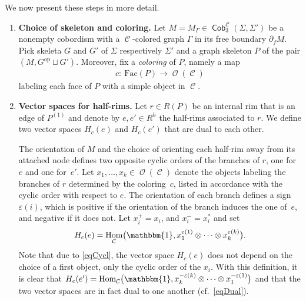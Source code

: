 \documentclass[pdftex]{sigma}
\DeclareMathOperator{\Hom}{Hom}
\DeclareMathOperator{\Cob}{\mathsf{Cob}}
\DeclareMathOperator{\calc}{\mathcal{C}}
\DeclareMathOperator{\calo}{\mathcal{O}}
\numberwithin{equation}{section}
\theoremstyle{definition}
\begin{document}
We now present these steps in more detail.
\begin{enumerate}\itemsep=0pt
 \item \textbf{Choice of skeleton and coloring.}
 Let $M = M_{\Gamma} \in \Cob_3^{\calc}(\Sigma, \Sigma')$ be a nonempty cobordism with a $\calc$-colored graph $\Gamma$ in its free boundary $\partial_fM$. Pick skeleta $G$ and $G'$ of $\Sigma$ respectively $\Sigma'$ and a graph skeleton $P$ of the pair $(M, G^{\mathrm{op}} \sqcup G')$. Moreover, fix a \textit{coloring} of $P$, namely a map
 \begin{align*}
 c\colon \ \mathrm{Fac}(P) \rightarrow \calo(\calc)
 \end{align*}
 labeling each face of $P$ with a simple object in $\calc$.
 \item \label{itemTVCon2} \textbf{Vector spaces for half-rims.} Let $r \in R(P)$ be an internal rim that is an edge of $P^{(1)}$ and denote by $e, e' \in R^h$ the half-rims associated to $r$. We define two vector spaces $H_c(e)$ and $H_c(e')$ that are dual to each other.

 The orientation of $M$ and the choice of orienting each half-rim away from its attached node defines two opposite cyclic orders of the branches of $r$, one for $e$ and one for~$e'$. Let $x_1, \dots, x_k \in \calo({\calc})$ denote the objects labeling the branches of $r$ determined by the coloring~$c$, listed in accordance with the cyclic order with respect to $e$. The orientation of each branch defines a sign $\varepsilon(i)$, which is positive if the orientation of the branch induces the one of~$e$, and negative if it does not. Let $x_i^+ = x_i$, and $x_i^- = x_i^{*}$ and set
 \begin{align*}
 H_c(e) = \Hom_{\calc}\bigl(\mathbbm{1}, x_1^{\varepsilon(1)} \otimes \dots \otimes x_k^{\varepsilon(k)}\bigr).
 \end{align*}
 Note that due to \eqref{eqCycl}, the vector space $H_c(e)$ does not depend on the choice of a first object, only the cyclic order of the $x_i$. With this definition, it is clear that $H_c(e') = \Hom_{\calc}\bigl(\mathbbm{1}, x_k^{-\varepsilon(k)} \otimes \dots \otimes x_1^{-\varepsilon(1)}\bigr)$ and that the two vector spaces are in fact dual to one another (cf.~\eqref{eqDual}).


\end{enumerate}
\end{document}
